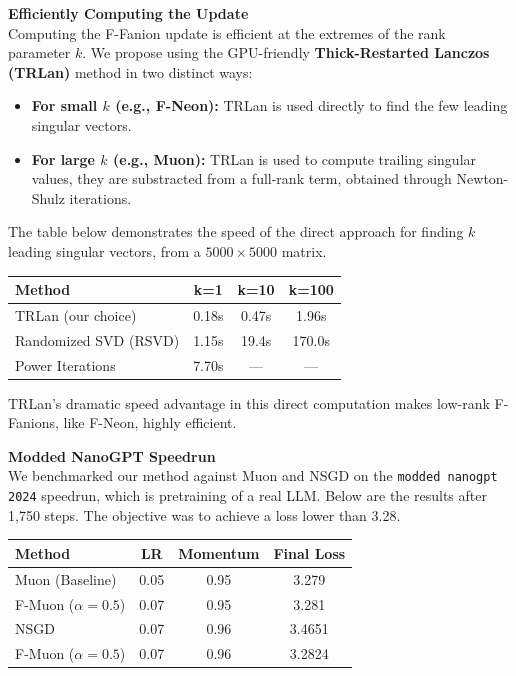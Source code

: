 \documentclass[fontsize=10pt]{beamer}
\begin{document}
\begin{frame}[fragile]
\begin{columns}[T]
\begin{column}{0.30\textwidth}
\vspace{0.5em}
\textbf{\Huge\color{Zen}Efficiently Computing the Update}\\[0.3em]

Computing the F-Fanion update is efficient at the extremes of the rank parameter $k$. We propose using the GPU-friendly \textbf{\color{HazySummerEve}Thick-Restarted Lanczos (TRLan)} method in two distinct ways:
\begin{itemize}
    \item \textbf{\color{HazySummerEve}For small $k$ (e.g., F-Neon):} TRLan is used directly to find the few leading singular vectors.
    \item \textbf{\color{HazySummerEve}For large $k$ (e.g., Muon):} TRLan is used to compute trailing singular values, they are substracted from a full-rank term, obtained through Newton-Shulz iterations.
\end{itemize}

The table below demonstrates the speed of the direct approach for finding $k$ leading singular vectors, from a $5000 \times 5000$ matrix. 

{
\centering
\begin{tabular}{lccc}
\toprule
\textbf{Method} & \textbf{k=1} & \textbf{k=10} & \textbf{k=100} \\
\midrule
TRLan (our choice) & 0.18s & 0.47s & 1.96s \\
Randomized SVD (RSVD)       & 1.15s          & 19.4s          & 170.0s \\
Power Iterations            & 7.70s          & ---            & --- \\
\bottomrule
\end{tabular}
\par
\vspace{0.5em}
}

TRLan's dramatic speed advantage in this direct computation makes low-rank F-Fanions, like F-Neon, highly efficient.

\vspace{0.5em}
\textbf{\Huge\color{Zen}Modded NanoGPT Speedrun}\\[0.3em]

We benchmarked our method against Muon and NSGD on the \texttt{modded nanogpt 2024} speedrun, which is pretraining of a real LLM. Below are the results after 1,750 steps. The objective was to achieve a loss lower than 3.28.

{
\centering
\begin{tabular}{lccc}
\toprule
\textbf{Method} & \textbf{LR} & \textbf{Momentum} & \textbf{Final Loss} \\
\midrule
Muon (Baseline)         & 0.05 & 0.95 & 3.279  \\
F-Muon ($\alpha=0.5$)   & 0.07 & 0.95 & 3.281 \\
NSGD                    & 0.07 & 0.96 & 3.4651 \\
F-Muon ($\alpha=0.5$)   & 0.07 & 0.96 & 3.2824 \\
\bottomrule
\end{tabular}
\par
}


\end{column}
\end{columns}
\end{frame}
\end{document}
